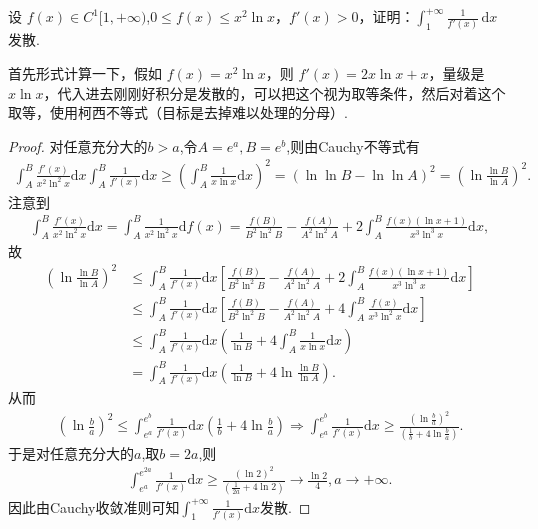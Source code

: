 \documentclass[../../main.tex]{subfiles}
\begin{document}
\begin{example}
设 $f(x)\in C^{1}[1,+\infty)$,$0\leq f(x)\leq x^{2}\ln x$，$f'(x)>0$，证明：$\int_{1}^{+\infty}\frac{1}{f'(x)}\,\mathrm{d}x$ 发散.
\end{example}
\begin{note}
首先形式计算一下，假如 $f(x)=x^{2}\ln x$，则 $f'(x)=2x\ln x+x$，量级是 $x\ln x$，代入进去刚刚好积分是发散的，可以把这个视为取等条件，然后对着这个取等，使用柯西不等式（目标是去掉难以处理的分母）.
\end{note}
\begin{proof}
对任意充分大的$b>a$,令$A=e^a,B=e^b$,则由Cauchy不等式有
\begin{align*}
\int_A^B{\frac{f' \left( x \right)}{x^2\ln ^2x}\mathrm{d}x}\int_A^B{\frac{1}{f' \left( x \right)}\mathrm{d}x}\geqslant \left( \int_A^B{\frac{1}{x\ln x}\mathrm{d}x} \right) ^2=\left( \ln\ln B-\ln\ln A \right) ^2=\left( \ln \frac{\ln B}{\ln A} \right) ^2.
\end{align*}
注意到
\begin{align*}
\int_A^B{\frac{f' \left( x \right)}{x^2\ln ^2x}\mathrm{d}x}=\int_A^B{\frac{1}{x^2\ln ^2x}\mathrm{d}f\left( x \right)}=\frac{f\left( B \right)}{B^2\ln ^2B}-\frac{f\left( A \right)}{A^2\ln ^2A}+2\int_A^B{\frac{f\left( x \right) \left( \ln x+1 \right)}{x^3\ln ^3x}\mathrm{d}x},
\end{align*}
故
\begin{align*}
\left( \ln \frac{\ln B}{\ln A} \right) ^2&\leqslant \int_A^B{\frac{1}{f' \left( x \right)}\mathrm{d}x}\left[ \frac{f\left( B \right)}{B^2\ln ^2B}-\frac{f\left( A \right)}{A^2\ln ^2A}+2\int_A^B{\frac{f\left( x \right) \left( \ln x+1 \right)}{x^3\ln ^3x}\mathrm{d}x} \right] \\
&\leqslant \int_A^B{\frac{1}{f' \left( x \right)}\mathrm{d}x}\left[ \frac{f\left( B \right)}{B^2\ln ^2B}-\frac{f\left( A \right)}{A^2\ln ^2A}+4\int_A^B{\frac{f\left( x \right)}{x^3\ln ^2x}\mathrm{d}x} \right] \\
&\leqslant \int_A^B{\frac{1}{f' \left( x \right)}\mathrm{d}x}\left( \frac{1}{\ln B}+4\int_A^B{\frac{1}{x\ln x}\mathrm{d}x} \right) \\
&=\int_A^B{\frac{1}{f' \left( x \right)}\mathrm{d}x}\left( \frac{1}{\ln B}+4\ln \frac{\ln B}{\ln A} \right) .
\end{align*}
从而
\begin{align*}
\left( \ln \frac{b}{a} \right) ^2\leqslant \int_{e^a}^{e^b}{\frac{1}{f' \left( x \right)}\mathrm{d}x}\left( \frac{1}{b}+4\ln \frac{b}{a} \right)
\Rightarrow \int_{e^a}^{e^b}{\frac{1}{f' \left( x \right)}\mathrm{d}x}\geqslant \frac{\left( \ln \frac{b}{a} \right) ^2}{\left( \frac{1}{b}+4\ln \frac{b}{a} \right)}.
\end{align*}
于是对任意充分大的$a$,取$b=2a$,则
\begin{align*}
\int_{e^a}^{e^{2a}}{\frac{1}{f' \left( x \right)}\mathrm{d}x}\geqslant \frac{\left( \ln 2 \right) ^2}{\left( \frac{1}{2a}+4\ln 2 \right)}\rightarrow \frac{\ln 2}{4},a\rightarrow +\infty .
\end{align*}
因此由Cauchy收敛准则可知$\int_1^{+\infty}{\frac{1}{f' \left( x \right)}\mathrm{d}x}$发散.
\end{proof}
\end{document}
